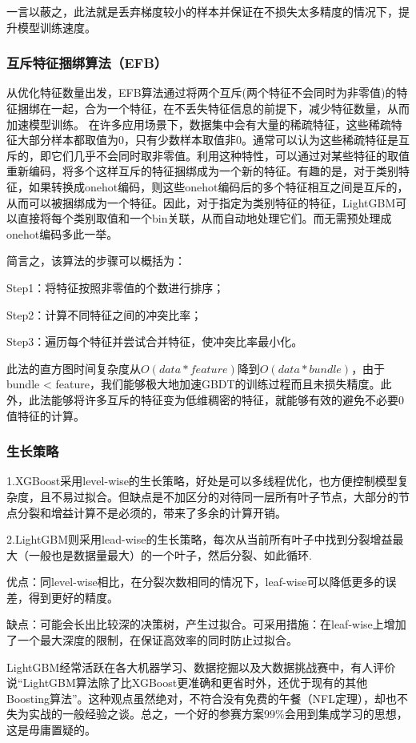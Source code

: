 一言以蔽之，此法就是丢弃梯度较小的样本并保证在不损失太多精度的情况下，提升模型训练速度。
\subsubsection{互斥特征捆绑算法（EFB）}
从优化特征数量出发，EFB算法通过将两个互斥(两个特征不会同时为非零值)的特征捆绑在一起，合为一个特征，在不丢失特征信息的前提下，减少特征数量，从而加速模型训练。          在许多应用场景下，数据集中会有大量的稀疏特征，这些稀疏特征大部分样本都取值为0，只有少数样本取值非0。通常可以认为这些稀疏特征是互斥的，即它们几乎不会同时取非零值。利用这种特性，可以通过对某些特征的取值重新编码，将多个这样互斥的特征捆绑成为一个新的特征。有趣的是，对于类别特征，如果转换成onehot编码，则这些onehot编码后的多个特征相互之间是互斥的，从而可以被捆绑成为一个特征。因此，对于指定为类别特征的特征，LightGBM可以直接将每个类别取值和一个bin关联，从而自动地处理它们。而无需预处理成onehot编码多此一举。

简言之，该算法的步骤可以概括为：

Step1：将特征按照非零值的个数进行排序；

Step2：计算不同特征之间的冲突比率；

Step3：遍历每个特征并尝试合并特征，使冲突比率最小化。

此法的直方图时间复杂度从$O(data*feature)$降到$O(data*bundle)$，由于bundle < feature，我们能够极大地加速GBDT的训练过程而且未损失精度。此外，此法能够将许多互斥的特征变为低维稠密的特征，就能够有效的避免不必要0值特征的计算。
\subsubsection{生长策略}
1.XGBoost采用level-wise的生长策略，好处是可以多线程优化，也方便控制模型复杂度，且不易过拟合。但缺点是不加区分的对待同一层所有叶子节点，大部分的节点分裂和增益计算不是必须的，带来了多余的计算开销。

2.LightGBM则采用lead-wise的生长策略，每次从当前所有叶子中找到分裂增益最大（一般也是数据量最大）的一个叶子，然后分裂、如此循环.

优点：同level-wise相比，在分裂次数相同的情况下，leaf-wise可以降低更多的误差，得到更好的精度。

缺点：可能会长出比较深的决策树，产生过拟合。可采用措施：在leaf-wise上增加了一个最大深度的限制，在保证高效率的同时防止过拟合。

LightGBM经常活跃在各大机器学习、数据挖掘以及大数据挑战赛中，有人评价说“LightGBM算法除了比XGBoost更准确和更省时外，还优于现有的其他Boosting算法”。这种观点虽然绝对，不符合没有免费的午餐（NFL定理），却也不失为实战的一般经验之谈。总之，一个好的参赛方案99\%会用到集成学习的思想，这是毋庸置疑的。

